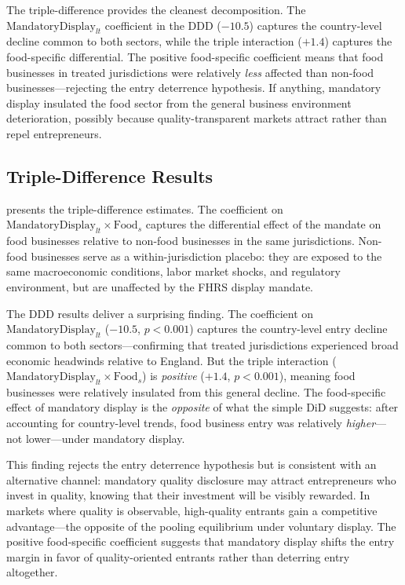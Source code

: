 \documentclass[12pt]{article}
\begin{document}
The triple-difference provides the cleanest decomposition. The $\text{MandatoryDisplay}_{lt}$ coefficient in the DDD ($-10.5$) captures the country-level decline common to both sectors, while the triple interaction ($+1.4$) captures the food-specific differential. The positive food-specific coefficient means that food businesses in treated jurisdictions were relatively \textit{less} affected than non-food businesses---rejecting the entry deterrence hypothesis. If anything, mandatory display insulated the food sector from the general business environment deterioration, possibly because quality-transparent markets attract rather than repel entrepreneurs.

\subsection{Triple-Difference Results}



 presents the triple-difference estimates. The coefficient on $\text{MandatoryDisplay}_{lt} \times \text{Food}_s$ captures the differential effect of the mandate on food businesses relative to non-food businesses in the same jurisdictions. Non-food businesses serve as a within-jurisdiction placebo: they are exposed to the same macroeconomic conditions, labor market shocks, and regulatory environment, but are unaffected by the FHRS display mandate.

The DDD results deliver a surprising finding. The coefficient on $\text{MandatoryDisplay}_{lt}$ ($-10.5$, $p < 0.001$) captures the country-level entry decline common to both sectors---confirming that treated jurisdictions experienced broad economic headwinds relative to England. But the triple interaction ($\text{MandatoryDisplay}_{lt} \times \text{Food}_s$) is \textit{positive} ($+1.4$, $p < 0.001$), meaning food businesses were relatively insulated from this general decline. The food-specific effect of mandatory display is the \textit{opposite} of what the simple DiD suggests: after accounting for country-level trends, food business entry was relatively \textit{higher}---not lower---under mandatory display.

This finding rejects the entry deterrence hypothesis but is consistent with an alternative channel: mandatory quality disclosure may attract entrepreneurs who invest in quality, knowing that their investment will be visibly rewarded. In markets where quality is observable, high-quality entrants gain a competitive advantage---the opposite of the pooling equilibrium under voluntary display. The positive food-specific coefficient suggests that mandatory display shifts the entry margin in favor of quality-oriented entrants rather than deterring entry altogether.
\end{document}
